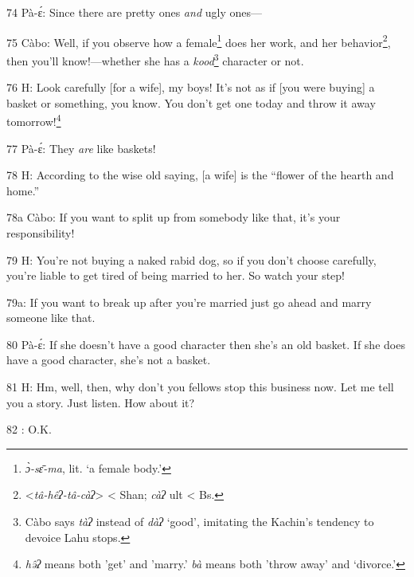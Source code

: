 74 Pà-ɛ́: Since there are pretty ones \textit{and} ugly ones---

75 Càbo: Well, if you observe how a female\footnote{\textit{ɔ̀-sɛ̄-ma}, lit. `a female body.'} does her work, and her behavior\footnote{<\textit{tâ-hêʔ-tâ-càʔ}> < Shan; \textit{càʔ} ult < Bs.},
then you'll know!---whether she has a \textit{kood}\footnote{Càbo says \textit{tàʔ} instead of \textit{dàʔ} `good', imitating the Kachin's tendency to devoice Lahu stops.} character or not.

76 H: Look carefully [for a wife], my boys! It's not as if [you were buying] a
basket or something, you know. You don't get one today and throw it away tomorrow!\footnote{\textit{hə̂ʔ} means both 'get' and 'marry.' \textit{bà} means both 'throw away' and `divorce.'}

77 Pà-ɛ́: They \textit{are} like baskets!

78 H: According to the wise old saying, [a wife] is the ``flower of the hearth
and home.''

78a Càbo: If you want to split up from somebody like that, it's your responsibility!

79 H: You're not buying a naked rabid dog, so if you don't choose carefully, you're
liable to get tired of being married to her. So watch your step!

79a: If you want to break up after you're married just go ahead and marry someone
like that.

80 Pà-ɛ́: If she doesn't have a good character then she's an old basket. If
she does have a good character, she's not a basket.

81 H: Hm, well, then, why don't you fellows stop this business now. Let me tell
you a story. Just listen. How about it?

82    : O.K.

